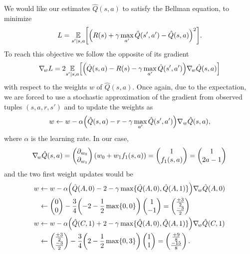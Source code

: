 \documentclass[11pt, a4paper]{article}
\begin{document}
\begin{enumerate}
    \begin{solution}
        We would like our estimates $\hat{Q}(s, a)$ to satisfy the
        Bellman equation, \ie{} to minimize
        \begin{equation*}
            L = \underset{s' \knowing s, a}{\E} \sbk*{\rbk*{R(s) + \gamma \max_{a'} \hat{Q}(s', a') - \hat{Q}(s, a)}^2} .
        \end{equation*}
        To reach this objective we follow the opposite of its gradient
        \begin{equation*}
            \nabla_{\!w} L = 2 \underset{s' \knowing s, a}{\E} \sbk*{\rbk*{\hat{Q}(s, a) - R(s) - \gamma \max_{a'} \hat{Q}(s', a')} \nabla_{\!w} \hat{Q}(s, a)}
        \end{equation*}
        with respect to the weights\footnotemark{} $w$ of $\hat{Q}(s, a)$. Once again, due to the expectation, we are forced to use a stochastic approximation of the gradient from observed tuples $(s, a, r, s')$ and to update the weights as
        \begin{equation*}
            w \gets w - \alpha \rbk*{\hat{Q}(s, a) - r - \gamma \max_{a'} \hat{Q}(s', a')} \nabla_w \hat{Q}(s, a) ,
        \end{equation*}
        where $\alpha$ is the learning rate. In our case,
        \begin{equation*}
            \nabla_{\!w} \hat{Q}(s, a) = \begin{pmatrix}\partial_{w_0} \\ \partial_{w_1} \end{pmatrix} (w_0 + w_1 f_1(s, a)) = \begin{pmatrix} 1 \\ f_1(s, a)\end{pmatrix} = \begin{pmatrix}1 \\ 2 a - 1\end{pmatrix} 
        \end{equation*}
        and the two first weight updates would be
        \begin{align*}
            w & \gets w - \alpha \rbk*{\hat{Q}(A, 0) - 2 - \gamma \max \cbk{\hat{Q}(A, 0), \hat{Q}(A, 1)}} \nabla_{\!w} \hat{Q}(A, 0) \\
            & \gets \mat{0 \\ 0} - \frac{3}{4} \rbk*{-2 - \frac{1}{2} \max\cbk{0, 0}} \mat{1 \\ -1} = \mat{\frac{+3}{2} \\ \frac{-3}{2}} \\
            w & \gets w - \alpha \rbk*{\hat{Q}(C, 1) + 2 - \gamma \max \cbk{\hat{Q}(A, 0), \hat{Q}(A, 1)}} \nabla_{\!w} \hat{Q}(C, 1) \\
            & \gets \mat{\frac{+3}{2} \\ \frac{-3}{2}} - \frac{3}{4} \rbk*{2 - \frac{1}{2} \max\cbk{0, 3}} \mat{1 \\ 1} = \mat{\frac{+9}{8} \\ \frac{-15}{8}} .
        \end{align*}
        

\end{solution}
\end{enumerate}
\end{document}
